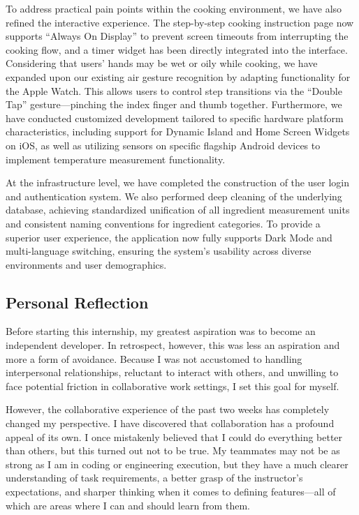 \documentclass[sigconf]{acmart}
\begin{document}
To address practical pain points within the cooking environment, we have also refined the interactive experience. The step-by-step cooking instruction page now supports ``Always On Display'' to prevent screen timeouts from interrupting the cooking flow, and a timer widget has been directly integrated into the interface. Considering that users' hands may be wet or oily while cooking, we have expanded upon our existing air gesture recognition by adapting functionality for the Apple Watch. This allows users to control step transitions via the ``Double Tap'' gesture---pinching the index finger and thumb together. Furthermore, we have conducted customized development tailored to specific hardware platform characteristics, including support for Dynamic Island and Home Screen Widgets on iOS, as well as utilizing sensors on specific flagship Android devices to implement temperature measurement functionality.

At the infrastructure level, we have completed the construction of the user login and authentication system. We also performed deep cleaning of the underlying database, achieving standardized unification of all ingredient measurement units and consistent naming conventions for ingredient categories. To provide a superior user experience, the application now fully supports Dark Mode and multi-language switching, ensuring the system's usability across diverse environments and user demographics.

\subsection{Personal Reflection}

Before starting this internship, my greatest aspiration was to become an independent developer. In retrospect, however, this was less an aspiration and more a form of avoidance. Because I was not accustomed to handling interpersonal relationships, reluctant to interact with others, and unwilling to face potential friction in collaborative work settings, I set this goal for myself.

However, the collaborative experience of the past two weeks has completely changed my perspective. I have discovered that collaboration has a profound appeal of its own. I once mistakenly believed that I could do everything better than others, but this turned out not to be true. My teammates may not be as strong as I am in coding or engineering execution, but they have a much clearer understanding of task requirements, a better grasp of the instructor's expectations, and sharper thinking when it comes to defining features---all of which are areas where I can and should learn from them.
\end{document}
